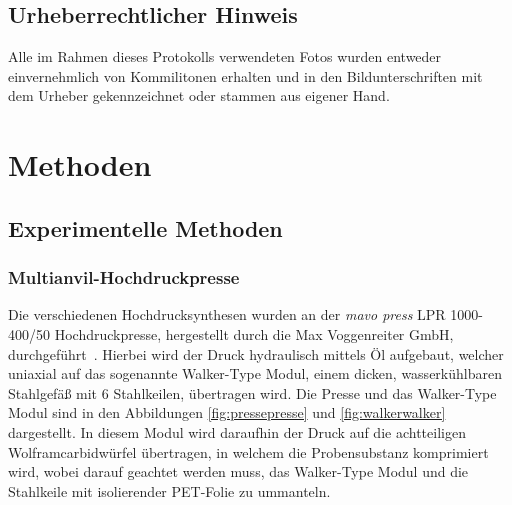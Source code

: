 \documentclass[12pt]{article}
\begin{document}
\subsection{Urheberrechtlicher Hinweis}
Alle im Rahmen dieses Protokolls verwendeten Fotos wurden entweder einvernehmlich von Kommilitonen erhalten und in den Bildunterschriften mit dem Urheber gekennzeichnet oder stammen aus eigener Hand.
\section{Methoden}
\subsection{Experimentelle Methoden}
\subsubsection{Multianvil-Hochdruckpresse}
Die verschiedenen Hochdrucksynthesen wurden an der \textit{mavo press} LPR 1000-400/50 Hochdruckpresse, hergestellt durch die Max Voggenreiter GmbH, durchgeführt~\cite{Voggenreiter}.
Hierbei wird der Druck hydraulisch mittels Öl aufgebaut, welcher uniaxial auf das sogenannte Walker-Type Modul, einem dicken, wasserkühlbaren Stahlgefäß mit 6 Stahlkeilen, übertragen wird. Die Presse und das Walker-Type Modul sind in den Abbildungen \ref{fig:pressepresse} und \ref{fig:walkerwalker} dargestellt. 
In diesem Modul wird daraufhin der Druck auf die achtteiligen Wolframcarbidwürfel übertragen, in welchem die Probensubstanz komprimiert wird, wobei darauf geachtet werden muss, das Walker-Type Modul und die Stahlkeile mit isolierender PET-Folie zu ummanteln.
\end{document}
